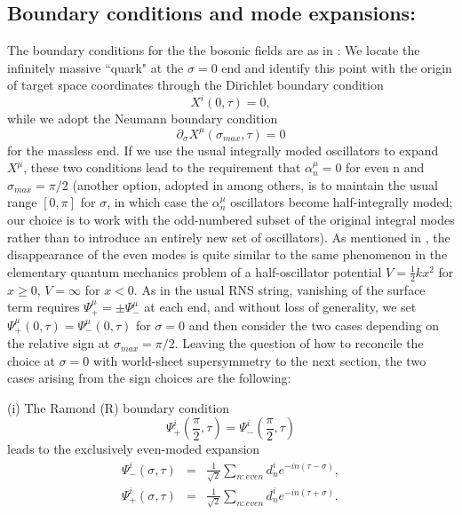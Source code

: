 \documentclass[a4paper,a4paper]{article}
\begin{document}
\subsection{Boundary conditions and mode expansions:}

The boundary conditions for the the bosonic fields are as in
\cite{Gursoy}: We locate the infinitely massive ``quark" at the
$\sigma=0$ end and identify this point with the origin of target
space coordinates through the Dirichlet boundary condition
\begin{equation}
X^{i}(0, \tau)=0,
\end{equation}
while we adopt the Neumann boundary condition
\begin{equation}
\partial_{\sigma}X^{\mu}(\sigma_{max}, \tau)=0
\end{equation}
for the massless end.  If we use the usual integrally moded
oscillators to expand $X^\mu$, these two conditions lead to the
requirement that $\alpha_{n}^{\mu}=0$ for even n and
$\sigma_{max}=\pi/2$ (another option, adopted in \cite{Fair} among others,
is to maintain the usual range $[0,\pi]$ for $\sigma$, in which case the
$\alpha_{n}^{\mu}$ oscillators become half-integrally moded; our
choice is to work with the odd-numbered subset of the original
integral modes rather than to introduce an entirely new set of
oscillators). As mentioned in \cite{Gursoy}, the disappearance of the
even modes is quite similar to the same phenomenon in the
elementary quantum mechanics problem of a half-oscillator
potential $V=\frac{1}{2} kx^2$ for $x\geq 0$, $V=\infty$ for $x<
0$. As in the usual RNS string, vanishing of the surface term
requires $\Psi_{+}^{\mu}=\pm\Psi_{-}^{\mu}$ at each end, and
without loss of generality, we set $\Psi_{+}^{\mu}(0, \tau
)=\Psi_{-}^{\mu}(0, \tau)$ for $\sigma=0$ and then consider the
two cases depending on the relative sign at $\sigma_{max}=\pi/2$.
Leaving the question of how to reconcile the choice at $\sigma=0$
with world-sheet supersymmetry to the next section, the two cases
arising from the sign choices are the following:

(i) The Ramond (R) boundary condition
\begin{equation}
\Psi_{+}^{i}(\frac{\pi}{2},\tau)=\Psi_{-}^{i}(\frac{\pi}{2},\tau)
\end{equation}
leads to the exclusively even-moded expansion
\begin{eqnarray}
\Psi_{-}^{i}(\sigma,\tau)&=&\frac{1}{\sqrt{2}}\sum_{n:even}d_{n}^{i}e^{-in(\tau-\sigma)},\\
\Psi_{+}^{i}(\sigma,\tau)&=&\frac{1}{\sqrt{2}}\sum_{n:even}d_{n}^{i}e^{-in(\tau+\sigma)}.
\end{eqnarray}
\end{document}
